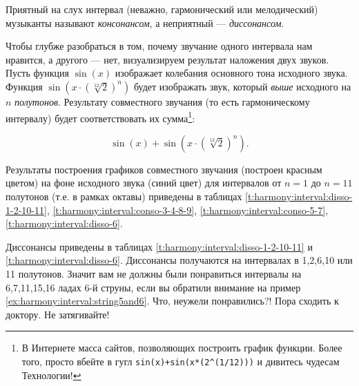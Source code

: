 Приятный на слух интервал (неважно, гармонический или мелодический) музыканты называют \emph{консонансом}, а неприятный --- \emph{диссонансом}. 

Чтобы глубже разобраться в том, почему звучание одного интервала нам нравится, а другого --- нет, визуализируем результат наложения двух звуков. Пусть функция $\sin(x)$ изображает колебания основного тона исходного звука. Функция $\sin(x\cdot(\sqrt[12]{2})^n)$ будет изображать звук, который \emph{выше} исходного на $n$ \emph{полутонов}. Результату совместного звучания (то есть гармоническому интервалу) будет соответствовать их сумма\footnote{В Интернете масса сайтов, позволяющих построить график функции. Более того, просто вбейте в гугл \texttt{sin(x)+sin(x*(2\^{}(1/12)))} и дивитесь чудесам Технологии!}:

\begin{equation}
    \label{eq:harmony:interval:sin}
    \sin(x) + \sin(x\cdot(\sqrt[12]{2})^n).
\end{equation}

Результаты построения графиков совместного звучания (построен красным цветом) на фоне исходного звука (синий цвет) для интервалов от $n=1$ до $n=11$ полутонов (т.е. в рамках октавы) приведены в таблицах \ref{t:harmony:interval:disso-1-2-10-11}, \ref{t:harmony:interval:conso-3-4-8-9}, \ref{t:harmony:interval:conso-5-7}, \ref{t:harmony:interval:disso-6}.

Диссонансы приведены в таблицах \ref{t:harmony:interval:disso-1-2-10-11} и \ref{t:harmony:interval:disso-6}. Диссонансы получаются на интервалах в 1,2,6,10 или 11 полутонов. Значит вам не должны были понравиться интервалы на 6,7,11,15,16 ладах 6-й струны, если вы обратили внимание на пример \ref{ex:harmony:interval:string5and6}. Что, неужели понравились?! Пора сходить к доктору. Не затягивайте!


